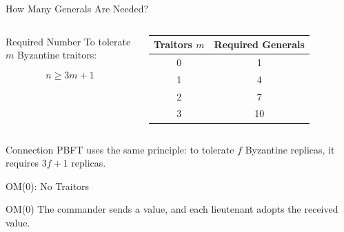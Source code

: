 \documentclass[aspectratio=169]{beamer}
\begin{document}
\begin{frame}{How Many Generals Are Needed?}

\begin{columns}

\begin{block}{Required Number}
To tolerate $m$ Byzantine traitors:

\[
n \ge 3m + 1
\]

\end{block}

\begin{table}
\centering
\begin{tabular}{cc}
\toprule
Traitors $m$ & Required Generals \\
\midrule
0 & 1 \\
1 & 4 \\
2 & 7 \\
3 & 10 \\
\bottomrule
\end{tabular}
\end{table}

\end{columns}

\vspace{0.4cm}

\begin{alertblock}{Connection}
PBFT uses the same principle: to tolerate $f$ Byzantine replicas, it requires $3f+1$ replicas.
\end{alertblock}

\end{frame}

\begin{frame}{OM(0): No Traitors}

\begin{center}
\end{center}

\begin{block}{OM(0)}
The commander sends a value, and each lieutenant adopts the received value.
\end{block}

\end{frame}
\end{document}
